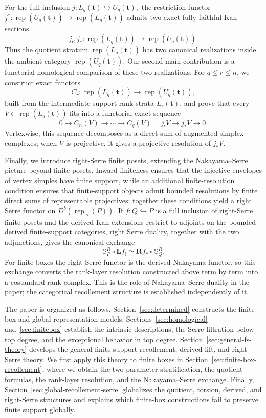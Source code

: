 \documentclass[12pt,reqno]{amsart}
\theoremstyle{definition}
\theoremstyle{remark}
\newcommand{\Rep}{\operatorname{rep}}
\begin{document}
For the full inclusion $j:L_q(\mathbf t)\hookrightarrow U_q(\mathbf t),$ the restriction functor $
j^*:\Rep(U_q(\mathbf t))\longrightarrow\Rep(L_q(\mathbf t))$
admits two exact fully faithful Kan sections
\[
j_!,j_*:\Rep(L_q(\mathbf t))\longrightarrow\Rep(U_q(\mathbf t)).
\]
Thus the quotient stratum $\Rep(L_q(\mathbf t))$ has two canonical
realizations inside the ambient category $\Rep(U_q(\mathbf t))$.  Our second
main contribution is a functorial homological comparison of these two
realizations.  For $q\le r\le n$, we construct exact functors
\[
C_r:\Rep(L_q(\mathbf t))\longrightarrow\Rep(U_q(\mathbf t)),
\]
built from the intermediate support-rank strata $L_r(\mathbf t)$, and prove
that every $V\in\Rep(L_q(\mathbf t))$ fits into a functorial exact sequence
\begin{equation}\label{eq:intro-rank-resolution}
0\longrightarrow C_n(V)\longrightarrow\cdots\longrightarrow
C_q(V)=j_!V\longrightarrow j_*V\longrightarrow0.
\end{equation}
Vertexwise, this sequence decomposes as a direct sum of augmented simplex
complexes; when $V$ is projective, it gives a projective resolution of
$j_*V$.

Finally, we introduce right-Serre finite posets, extending the
Nakayama--Serre picture beyond finite posets.  Inward finiteness ensures that
the injective envelopes of vertex simples have finite support, while an
additional finite-resolution condition ensures that finite-support objects
admit bounded resolutions by finite direct sums of representable projectives;
together these conditions yield a right Serre functor on
$D^b(\Rep_{\mathrm{fs}}(P))$.  If
$f:Q\hookrightarrow P$ is a full inclusion of right-Serre finite posets and the
derived Kan extensions restrict to adjoints on the bounded derived
finite-support categories, right Serre duality, together with the two
adjunctions, gives the canonical exchange
\begin{equation}
\mathbb S_P^R\circ\mathbf L f_!
\simeq
\mathbf R f_*\circ\mathbb S_Q^R.
\end{equation}
For finite boxes the right Serre functor is the derived Nakayama functor, so
this exchange converts the rank-layer resolution constructed above term by term
into a costandard rank complex.  This is the role of Nakayama--Serre duality in the
paper; the categorical recollement structure is established independently of
it.

The paper is organized as follows.  Section~\ref{sec:determined} constructs the
finite-box and global representation models.  Sections~\ref{sec:homological}
and~\ref{sec:finitebox} establish the intrinsic descriptions, the Serre
filtration below top degree, and the exceptional behavior in top degree.
Section~\ref{sec:general-fs-theory} develops the general finite-support
recollement, derived-lift, and right-Serre theory.  We first apply this theory
to finite boxes in Section~\ref{sec:finite-box-recollement}, where we obtain
the two-parameter stratification, the quotient formulas, the rank-layer
resolution, and the Nakayama--Serre exchange.  Finally,
Section~\ref{sec:global-recollement-serre} globalizes the quotient, torsion,
derived, and right-Serre structures and explains which finite-box
constructions fail to preserve finite support globally.
\end{document}

